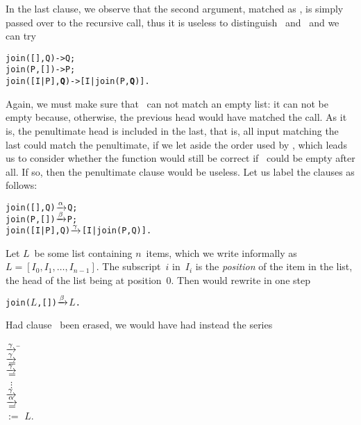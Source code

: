 In the last clause, we observe that the second argument, matched as
\erlcode{[J|Q]}, is simply passed over to the recursive call, thus it
is useless to distinguish ~and~ and we can try
\begin{alltt}
join(   [], Q) -> Q;
join(    P,[]) -> P;
join([I|P], \textbf{Q}) -> [I|join(P,\textbf{Q})].\hfill% \emph{Can} Q \emph{be} []\emph{?}
\end{alltt}
Again, we must make sure that ~can not match an empty list:
it can not be empty because, otherwise, the previous head would have
matched the call. As it is, the penultimate head is included in the
last, that is, all input matching the last could match the
penultimate, if we let aside the order used by \Erlang, which leads us
to consider whether the function would still be correct if
~could be empty after all. If so, then the penultimate
clause would be useless. Let us label the clauses as follows:
\begin{alltt}
join(   [], Q) \(\smashedrightarrow{\alpha}\) Q;
join(    P,[]) \(\smashedrightarrow{\beta}\) P;
join([I|P], Q) \(\smashedrightarrow{\gamma}\) [I|join(P,Q)].
\end{alltt}
Let \(L\)~be some list containing \(n\)~items, which we write
informally as \(L = [I_0, I_1, \dots, I_{n-1}]\). The subscript~\(i\)
in~\(I_i\) is the \emph{position} of the item in the list, the head of
the list being at position~\(0\). Then \Erlang would rewrite in one
step
\begin{alltt}
join(\(L\),[]) \(\smashedrightarrow{\beta}\) \(L\).
\end{alltt}
Had clause~\clause{\beta} been erased, we would have had instead the
series
\begin{tabbing}
 \= \(\xrightarrow{\smash{\gamma}}\) \= \erlcode{[\(I\sb{0}\)|join([\(I\sb{1}\),\(\ldots\),\(I\sb{n-1}\)],[])]}\\
           \> \(\xrightarrow{\smash{\gamma}}\) \> \\
           \> \(=\) \> \erlcode{[\(I\sb{0}\),\(I\sb{1}\)|join([\(I\sb{2}\),\(\ldots\),\(I\sb{n-1}\)],[])]}\\
           \> \(\xrightarrow{\smash{\gamma}}\) \> \\
           \> \(=\) \> \erlcode{[\(I\sb{0}\),\(I\sb{1}\),\(I\sb{2}\)|join([\(I\sb{3}\),\(\ldots\),\(I\sb{n-1}\)],[])]}\\
           \> \ \(\vdots\)\\
           \> \(\xrightarrow{\smash{\gamma}}\) \> \\
           \> \(\xrightarrow{\smash{\alpha}}\) \> \erlcode{[\(I\sb{0}\),\(I\sb{1}\),\(\ldots\),\(I\sb{n-1}\)|[]]}\\
           \> \(=\) \>
           \erlcode{[\(I\sb{0}\),\(I\sb{1}\),\(\ldots\),\(I\sb{n-1}\)]}\\
           \> \(:=\) \> \(L\)\textrm{.}
\end{tabbing}
